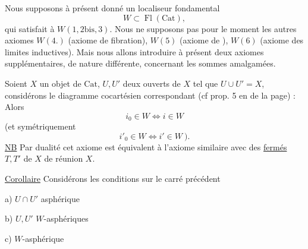 Nous supposons à présent donné un localiseur
fondamental
\[
W\subset\operatorname{Fl}(\mathrm{Cat}),
\]
qui satisfait à $W(1,2\mathrm{bis},3)$. Nous ne supposons
pas pour le moment  les  autres axiomes
 $W(4.)$  (axiome de fibration), $W(5)$
(axiome de ), $W(6)$ (axiome des
limites inductives). Mais nous allons introduire
à présent deux axiomes  supplémentaires, de
nature différente,  concernant les sommes
amalgamées.

  Soient $X$ un objet de $\mathrm{Cat}$, $U,U'$ deux
ouverts de $X$ tel que $U\cup U'=X$, considérons le
diagramme cocartésien correspondant (cf prop. 5 en
 de la page) :
Alors
\[
i_0\in W\Longleftrightarrow i\in W
\]
(et symétriquement
\[
i'_0\in W\Longleftrightarrow i'\in W\ \bigr).
\]
\uline{NB} Par dualité cet axiome est équivalent à l'axiome similaire
avec des \uline{fermés} $T,T'$ de $X$ de réunion $X$.

\uline{Corollaire}\quad {} Considérons les conditions   sur
le carré précédent

a) $U\cap U'$ asphérique

b) $U,U'$ $W$-asphériques

c)  $W$-asphérique


